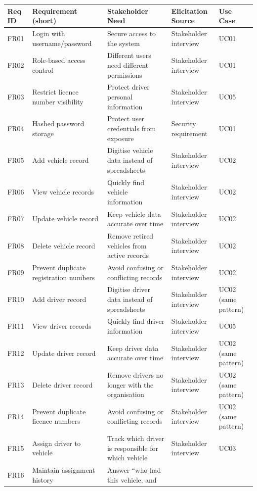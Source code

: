 \documentclass[11pt,a4paper]{article}
\begin{document}
\begin{longtable}{@{}p{1.2cm}p{4.0cm}p{4.3cm}p{2.5cm}p{1.3cm}@{}}
\toprule
Req ID & Requirement (short) & Stakeholder Need & Elicitation Source &
Use Case \\
\midrule
\endhead
FR01 & Login with username/password & Secure access to the system &
Stakeholder interview & UC01 \\
FR02 & Role-based access control & Different users need different
permissions & Stakeholder interview & UC01 \\
FR03 & Restrict licence number visibility & Protect driver personal
information & Stakeholder interview & UC05 \\
FR04 & Hashed password storage & Protect user credentials from exposure
& Security requirement & UC01 \\
FR05 & Add vehicle record & Digitise vehicle data instead of spreadsheets
& Stakeholder interview & UC02 \\
FR06 & View vehicle records & Quickly find vehicle information &
Stakeholder interview & UC02 \\
FR07 & Update vehicle record & Keep vehicle data accurate over time &
Stakeholder interview & UC02 \\
FR08 & Delete vehicle record & Remove retired vehicles from active
records & Stakeholder interview & UC02 \\
FR09 & Prevent duplicate registration numbers & Avoid confusing or
conflicting records & Stakeholder interview & UC02 \\
FR10 & Add driver record & Digitise driver data instead of spreadsheets
& Stakeholder interview & UC02 (same pattern) \\
FR11 & View driver records & Quickly find driver information &
Stakeholder interview & UC05 \\
FR12 & Update driver record & Keep driver data accurate over time &
Stakeholder interview & UC02 (same pattern) \\
FR13 & Delete driver record & Remove drivers no longer with the
organisation & Stakeholder interview & UC02 (same pattern) \\
FR14 & Prevent duplicate licence numbers & Avoid confusing or conflicting
records & Stakeholder interview & UC02 (same pattern) \\
FR15 & Assign driver to vehicle & Track which driver is responsible for
which vehicle & Stakeholder interview & UC03 \\
FR16 & Maintain assignment history & Answer ``who had this vehicle, and

\end{longtable}
\end{document}
